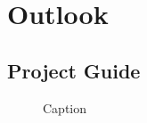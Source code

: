 \documentclass[conference]{IEEEtran}
\begin{document}
\section{Outlook}\label{Chap:Outlook}
\blindtext

\clearpage
\newpage
\onecolumn
\appendix

\subsection{Project Guide}\label{appendix:docu}


\begin{figure}[!h]
	\centering
	\caption{Caption}
\end{figure}

\FloatBarrier


\FloatBarrier

\newpage
\onecolumn




\vspace{12pt}
\end{document}
